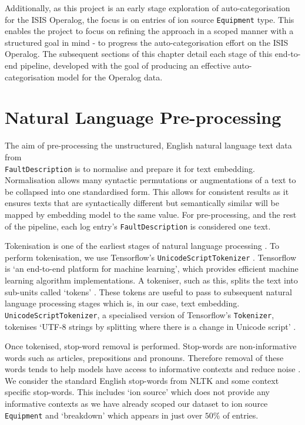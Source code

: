 \documentclass[10pt,oneside]{report}
\begin{document}
Additionally, as this project is an early stage exploration of auto-categorisation for the ISIS Operalog, the focus is on entries of ion source \texttt{Equipment} type. This enables the project to focus on refining the approach in a scoped manner with a structured goal in mind - to progress the auto-categorisation effort on the ISIS Operalog. The subsequent sections of this chapter detail each stage of this end-to-end pipeline, developed with the goal of producing an effective auto-categorisation model for the Operalog data.

\section{Natural Language Pre-processing}\label{sec:preproc}

The aim of pre-processing the unstructured, English natural language text data from \\ \texttt{FaultDescription} is to normalise and prepare it for text embedding. Normalisation allows many syntactic permutations or augmentations of a text to be collapsed into one standardised form. This allows for consistent results as it ensures texts that are syntactically different but semantically similar will be mapped by embedding model to the same value. For pre-processing, and the rest of the pipeline, each log entry's \texttt{FaultDescription} is considered one text.

Tokenisation is one of the earliest stages of natural language processing \cite{tabassum2020survey, sammons2016edison}. To perform tokenisation, we use Tensorflow's \texttt{UnicodeScriptTokenizer} \cite{tensorflow2015whitepaper}. Tensorflow is `an end-to-end platform for machine learning', which provides efficient machine learning algorithm implementations. A tokeniser, such as this, splits the text into sub-units called `tokens' \cite{gefenstette1999tokenization}. These tokens are useful to pass to subsequent natural language processing stages which is, in our case, text embedding. \texttt{UnicodeScriptTokenizer}, a specialised version of Tensorflow's \texttt{Tokenizer}, tokenises `UTF-8 strings by splitting where there is a change in Unicode script' \cite{tensorflow2015whitepaper}.

Once tokenised, stop-word removal is performed. Stop-words are non-informative words such as articles, prepositions and pronouns. Therefore removal of these words tends to help models have access to informative contexts and reduce noise \cite{silva2003importance}. We consider the standard English stop-words from NLTK \cite{bird2009natural} and some context specific stop-words. This includes `ion source' which does not provide any informative contexts as we have already scoped our dataset to ion source \texttt{Equipment} and `breakdown' which appears in just over $50\%$ of entries. 
\end{document}
